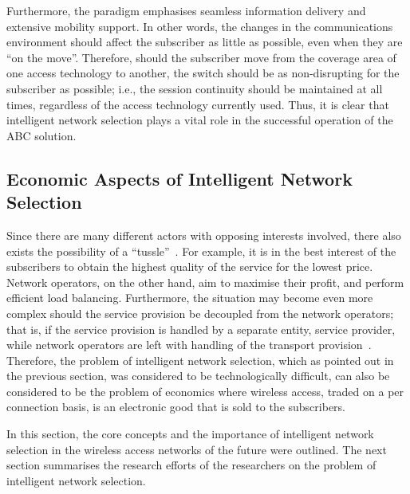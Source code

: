 Furthermore, the paradigm emphasises seamless information delivery and extensive mobility support. In other words, the changes in the communications environment should affect the subscriber as little as possible, even when they are ``on the move''. Therefore, should the subscriber move from the coverage area of one access technology to another, the switch should be as non-disrupting for the subscriber as possible; i.e., the session continuity should be maintained at all times, regardless of the access technology currently used. Thus, it is clear that intelligent network selection plays a vital role in the successful operation of the ABC solution.

\subsection{Economic Aspects of Intelligent Network Selection} %
\label{sub:economic_aspects_of_intelligent_network_selection_intelligent}
Since there are many different actors with opposing interests involved, there also exists the possibility of a ``tussle''~\cite{Clark02}. For example, it is in the best interest of the subscribers to obtain the highest quality of the service for the lowest price. Network operators, on the other hand, aim to maximise their profit, and perform efficient load balancing. Furthermore, the situation may become even more complex should the service provision be decoupled from the network operators; that is, if the service provision is handled by a separate entity, service provider, while network operators are left with handling of the transport provision~\cite{DMBushTussle09}. Therefore, the problem of intelligent network selection, which as pointed out in the previous section, was considered to be technologically difficult, can also be considered to be the problem of economics where wireless access, traded on a per connection basis, is an electronic good that is sold to the subscribers.

In this section, the core concepts and the importance of intelligent network selection in the wireless access networks of the future were outlined. The next section summarises the research efforts of the researchers on the problem of intelligent network selection.

